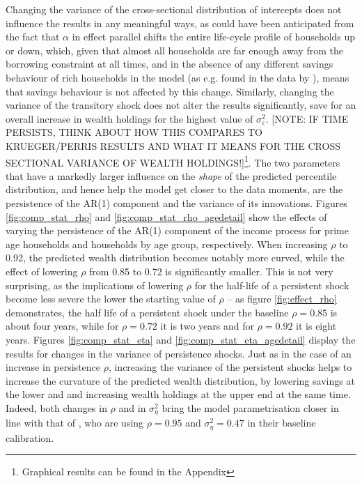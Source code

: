 Changing the variance of the cross-sectional distribution of intercepts does not
influence the results in any meaningful ways, as could have been anticipated 
from the fact that $\alpha$ in effect parallel shifts the entire life-cycle
profile of households up or down, which, given that almost all households are 
far enough away from the borrowing constraint at all times, and in the absence
of any different savings behaviour of rich households in the model (as e.g. found
in the data by \citealt{DSK2004}), means that savings behaviour is not affected
by this change. Similarly, changing the variance of the transitory shock does 
not alter the results significantly, save for an overall increase in wealth holdings
for the highest value of $\sigma^2_{\varepsilon}$. [NOTE: IF TIME PERSISTS, THINK
ABOUT HOW THIS COMPARES TO KRUEGER/PERRIS RESULTS AND WHAT IT MEANS FOR THE CROSS
SECTIONAL VARIANCE OF WEALTH HOLDINGS!]\footnote{Graphical results can be found
in the Appendix}.
The two parameters that have a markedly larger influence on the \textit{shape}
of the predicted percentile distribution, and hence help the model get closer
to the data moments, are the persistence of the AR(1) component and the variance
of its innovations. Figures \ref{fig:comp_stat_rho} and \ref{fig:comp_stat_rho_agedetail} 
show the effects of varying the persistence of the AR(1) component of the income 
process for prime age households and households by age group, respectively. When
increasing $\rho$ to 0.92, the predicted wealth distribution becomes notably more
curved, while the effect of lowering $\rho$ from 0.85 to 0.72 is significantly 
smaller. This is not very surprising, as the implications of lowering $\rho$
for the half-life of a persistent shock become less severe the lower the starting
value of $\rho$ -- as figure \ref{fig:effect_rho} demonstrates, the half life
of a persistent shock under the baseline $\rho=0.85$ is about four years, while 
for $\rho=0.72$ it is two years and for $\rho=0.92$ it is eight years. 
Figures \ref{fig:comp_stat_eta} and \ref{fig:comp_stat_eta_agedetail} display
the results for changes in the variance of persistence shocks. Just as in the 
case of an increase in persistence $\rho$, increasing the variance of the persistent
shocks helps to increase the curvature of the predicted wealth distribution, by
lowering savings at the lower and and increasing wealth holdings at the upper end
at the same time. Indeed, both changes in $\rho$ and in $\sigma^2_{\eta}$ bring
the model parametrisation closer in line with that of \citet{HintermaierKoeniger2011},
who are using $\rho=0.95$ and $\sigma^2_{\eta}=0.47$ in their baseline calibration.
